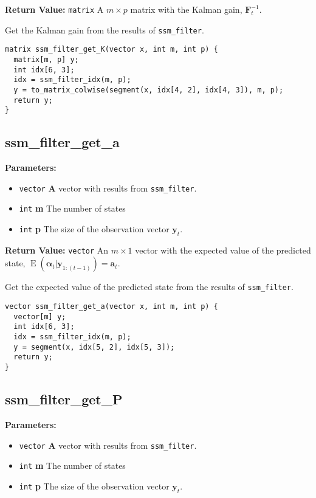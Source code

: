 \documentclass[]{book}
\providecommand{\tightlist}{%
  \setlength{\itemsep}{0pt}\setlength{\parskip}{0pt}}
\DeclareMathOperator{\E}{E}
\newcommand{\mat}[1]{\boldsymbol{#1}}
\renewcommand{\vec}[1]{\boldsymbol{#1}}
\begin{document}
\textbf{Return Value:} \texttt{matrix} A \(m \times p\) matrix with the
Kalman gain, \(\mat{F}^{-1}_t\).

Get the Kalman gain from the results of \texttt{ssm\_filter}.

\begin{verbatim}
matrix ssm_filter_get_K(vector x, int m, int p) {
  matrix[m, p] y;
  int idx[6, 3];
  idx = ssm_filter_idx(m, p);
  y = to_matrix_colwise(segment(x, idx[4, 2], idx[4, 3]), m, p);
  return y;
}
\end{verbatim}

\subsection{ssm\_filter\_get\_a}\label{ssmux5ffilterux5fgetux5fa}

\textbf{Parameters:}

\begin{itemize}
\tightlist
\item
  \texttt{vector} \textbf{A} vector with results from
  \texttt{ssm\_filter}.
\item
  \texttt{int} \textbf{m} The number of states
\item
  \texttt{int} \textbf{p} The size of the observation vector
  \(\vec{y}_t\).
\end{itemize}

\textbf{Return Value:} \texttt{vector} An \(m \times 1\) vector with the
expected value of the predicted state,
\(\E(\vec{\alpha}_t | \vec{y}_{1:(t-1)}) = \vec{a}_t\).

Get the expected value of the predicted state from the results of
\texttt{ssm\_filter}.

\begin{verbatim}
vector ssm_filter_get_a(vector x, int m, int p) {
  vector[m] y;
  int idx[6, 3];
  idx = ssm_filter_idx(m, p);
  y = segment(x, idx[5, 2], idx[5, 3]);
  return y;
}
\end{verbatim}

\subsection{ssm\_filter\_get\_P}\label{ssmux5ffilterux5fgetux5fp}

\textbf{Parameters:}

\begin{itemize}
\tightlist
\item
  \texttt{vector} \textbf{A} vector with results from
  \texttt{ssm\_filter}.
\item
  \texttt{int} \textbf{m} The number of states
\item
  \texttt{int} \textbf{p} The size of the observation vector
  \(\vec{y}_t\).
\end{itemize}
\end{document}
